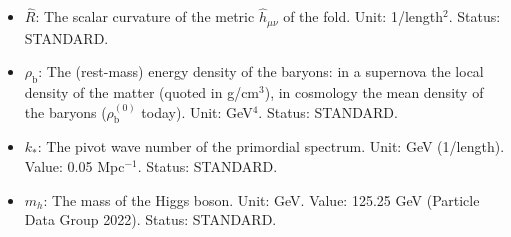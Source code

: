 \documentclass[
  10pt,
]{article}
\begin{document}
\begin{itemize}
  \(0.842\,\rho_{\mathrm{c}}^{(0)}\) if they have none,
  \(0.891\,\rho_{\mathrm{c}}^{(0)}\) for \(+\rho_{\mathrm{b}}\). Status:
  DERIVED (the condition and the values for each choice), ASSUMED (the
  pressure of the baryons along the extra times).
\item
  \(\hat R\): The scalar curvature of the metric \(\hat h_{\mu\nu}\) of
  the fold. Unit: 1/length\(^2\). Status: STANDARD.
\item
  \(\rho_{\mathrm{b}}\): The (rest-mass) energy density of the baryons:
  in a supernova the local density of the matter (quoted in g/cm\(^3\)),
  in cosmology the mean density of the baryons
  (\(\rho_{\mathrm{b}}^{(0)}\) today). Unit: GeV\(^4\). Status:
  STANDARD.
\item
  \(k_*\): The pivot wave number of the primordial spectrum. Unit: GeV
  (1/length). Value: 0.05 Mpc\(^{-1}\). Status: STANDARD.
\item
  \(m_h\): The mass of the Higgs boson. Unit: GeV. Value: 125.25 GeV
  (Particle Data Group 2022). Status: STANDARD.
\end{itemize}
\end{document}
